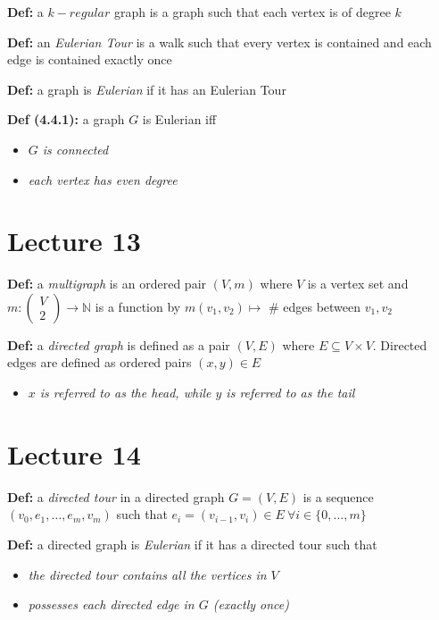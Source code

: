 \documentclass[12pt]{article}
\begin{document}
\textbf{Def: }a \emph{$k-regular$} graph is a graph such that each vertex is of degree $k$

\textbf{Def: }an \emph{Eulerian Tour} is a walk such that every vertex is contained and each edge is contained exactly once

\textbf{Def: }a graph is \emph{Eulerian} if it has an Eulerian Tour

\textbf{Def (4.4.1): }a graph $G$ is Eulerian iff 
\begin{itemize}
    \item \emph{$G$ is connected}
    \item \emph{each vertex has even degree}
\end{itemize}
\clearpage

\section{Lecture 13}
\textbf{Def: }a \emph{multigraph} is an ordered pair $(V, m)$ where $V$ is a vertex set and \\$m: \begin{pmatrix} V \\ 2\end{pmatrix} \rightarrow \mathbb{N}$ is a function by $m(v_1, v_2) \mapsto$ \# edges between $v_1, v_2$

\textbf{Def: }a \emph{directed graph} is defined as a pair $(V, E)$ where $E \subseteq V \times V$. Directed edges are defined as ordered pairs $(x, y) \in E$
\begin{itemize}
    \item \emph{$x$ is referred to as the head, while $y$ is referred to as the tail}
\end{itemize}
\clearpage

\section{Lecture 14}

\textbf{Def: }a \emph{directed tour} in a directed graph $G = (V, E)$ is a sequence $(v_0, e_1, \dots, e_m, v_m)$ such that $e_i = (v_{i - 1}, v_i) \in E\ \forall i \in \{ 0, \dots, m \}$ 

\textbf{Def: }a directed graph is \emph{Eulerian} if it has a directed tour such that 
\begin{itemize}
    \item \emph{the directed tour contains all the vertices in $V$}
    \item \emph{possesses each directed edge in $G$ (exactly once)}
\end{itemize}
\end{document}
